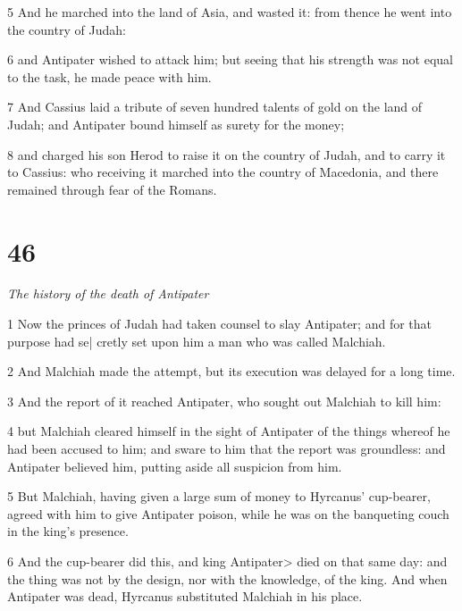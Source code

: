 \par 5 And he marched into the land of Asia, and wasted it: from thence he went into the country of Judah: 

\par 6 and Antipater wished to attack him; but seeing that his strength was not equal to the task, he made peace with him. 

\par 7 And Cassius laid a tribute of seven hundred talents of gold on the land of Judah; and Antipater bound himself as surety for the money; 

\par 8 and charged his son Herod to raise it on the country of Judah, and to carry it to Cassius: who receiving it marched into the country of Macedonia, and there remained through fear of the Romans. 

\chapter{46}

\par \textit{The history of the death of Antipater}

\par 1 Now the princes of Judah had taken counsel to slay Antipater; and for that purpose had se| cretly set upon him a man who was called Malchiah. 

\par 2 And Malchiah made the attempt, but its execution was delayed for a long time. 

\par 3 And the report of it reached Antipater, who sought out Malchiah to kill him: 

\par 4 but Malchiah cleared himself in the sight of Antipater of the things whereof he had been accused to him; and sware to him that the report was groundless: and Antipater believed him, putting aside all suspicion from him. 

\par 5 But Malchiah, having given a large sum of money to Hyrcanus’ cup-bearer, agreed with him to give Antipater poison, while he was on the banqueting couch in the king’s presence. 

\par 6 And the cup-bearer did this, and king Antipater> died on that same day: and the thing was not by the design, nor with the knowledge, of the king. And when Antipater was dead, Hyrcanus substituted Malchiah in his place. 

